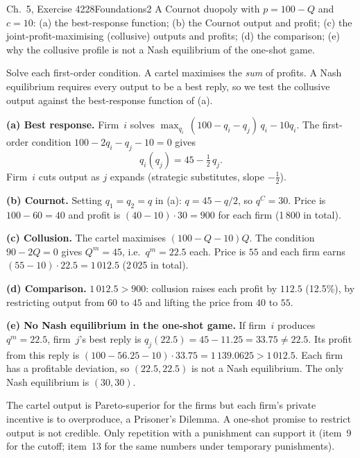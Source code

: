 \begin{exsol}{\MG{} Ch.~5, Exercise 4}{228}{Foundations}{2}
\asked A Cournot duopoly with $p = 100 - Q$ and $c = 10$: (a) the best-response function; (b) the
Cournot output and profit; (c) the joint-profit-maximising (collusive) outputs and profits; (d) the
comparison; (e) why the collusive profile is not a Nash equilibrium of the one-shot game.

\method Solve each first-order condition. A cartel
maximises the \emph{sum} of profits. A Nash equilibrium requires every output to be a best reply, so
we test the collusive output against the best-response function of (a).

\solution
\textbf{(a) Best response.} Firm~$i$ solves $\max_{q_i}\,(100 - q_i - q_j)\,q_i - 10 q_i$. The
first-order condition $100 - 2q_i - q_j - 10 = 0$ gives
\[
  q_i(q_j) = 45 - \tfrac12\, q_j .
\]
Firm~$i$ cuts output as $j$ expands (strategic substitutes, slope $-\frac12$).

\textbf{(b) Cournot.} Setting $q_1 = q_2 = q$ in (a): $q = 45 - q/2$, so $q^C = 30$. Price is $100 - 60
= 40$ and profit is $(40 - 10)\cdot 30 = 900$ for each firm (1\,800 in total).

\textbf{(c) Collusion.} The cartel maximises $(100 - Q - 10)Q$. The condition $90 - 2Q = 0$ gives
$Q^m = 45$, i.e.\ $q^m = 22.5$ each. Price is $55$ and each firm earns $(55 - 10)\cdot 22.5 = 1\,012.5$
(2\,025 in total).

\textbf{(d) Comparison.} $1\,012.5 > 900$: collusion raises each profit by $112.5$ (12.5\%), by
restricting output from $60$ to $45$ and lifting the price from $40$ to $55$.

\textbf{(e) No Nash equilibrium in the one-shot game.} If firm~$i$ produces $q^m = 22.5$, firm~$j$'s
best reply is $q_j(22.5) = 45 - 11.25 = 33.75 \ne 22.5$. Its profit from this reply is
$(100 - 56.25 - 10)\cdot 33.75 = 1\,139.0625 > 1\,012.5$. Each firm has a profitable deviation, so
$(22.5, 22.5)$ is not a Nash equilibrium. The only Nash equilibrium is $(30, 30)$.

\interp The cartel output is Pareto-superior for the firms but each firm's private incentive is to
overproduce, a Prisoner's Dilemma. A one-shot promise to restrict output is not credible. Only repetition
with a punishment can support it (item~9 for the cutoff; item~13 for the same numbers under temporary
punishments).


\end{exsol}
